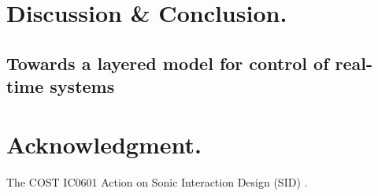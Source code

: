\documentclass{article}
\begin{document}
\section{Discussion \& Conclusion.}


\subsection{Towards a layered model for control of real-time systems}



%

\section{Acknowledgment.}

 The COST IC0601 Action on Sonic Interaction Design (SID) .


\small

\end{document}
